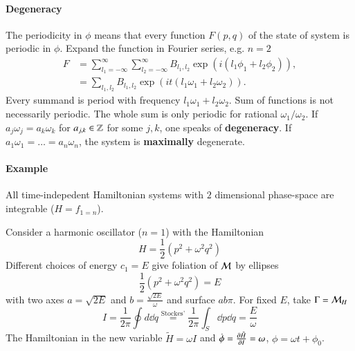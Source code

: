 \paragraph{Degeneracy}
The periodicity in $\phi$ means that every function $F(p, q)$ of the state of system is periodic in $\phi$. Expand the function in Fourier series, e.g. $n=2$
\begin{align*}
	F &= \sum_{l_1 = -\infty}^{\infty}\sum_{l_2 = -\infty}^{\infty} B_{l_1, l_2} \exp(i (l_1 \phi_1 + l_2\phi_2)), \\
	  &= \sum_{l_1, l_2} B_{l_1, l_2} \exp(it(l_1 \omega_1 + l_2 \omega_2)).
\end{align*}
Every summand is period with frequency $l_1\omega_1 + l_2\omega_2$. Sum of functions is not necessarily periodic. The whole sum is only periodic for rational $\omega_1 / \omega_2$. If $a_j \omega_j = a_k \omega_k$ for $a_{j, k} \in \mathbb{Z}$ for some $j, k$, one speaks of \textbf{degeneracy}. If $a_1\omega_1 = \dots = a_n \omega_n$, the system is \textbf{maximally} degenerate.

\paragraph{Example}
All time-indepedent Hamiltonian systems with $2$ dimensional phase-space are integrable ($H=f_{1=n}$). 

Consider a harmonic oscillator ($n=1$) with the Hamiltonian
\begin{equation*}
	H = \frac{1}{2} (p^2 + \omega^2 q^2)
\end{equation*}
Different choices of energy $c_1 = E$ give foliation of $\mathcal{M}$ by ellipses
\begin{equation*}
	\frac{1}{2} \left( p^2 + \omega^2 q^2 \right) 	 = E
\end{equation*}
with two axes $a = \sqrt{2E}$ and $b = \frac{\sqrt{2E}}{\omega}$ and surface $ab\pi$. For fixed $E$, take $\Gamma = \mathcal{M}_H$
\begin{equation*}
	I = \frac{1}{2\pi} \oint d\dd{q} \stackrel{\text{Stockes'}}{=} \frac{1}{2\pi} \int_{S} \dd{p} \dd{q} = \frac{E}{\omega}
\end{equation*}
The Hamiltonian in the new variable $\tilde{H} = \omega I$ and $\dot{\phi} = \pdv{\tilde{H}}{I} = \omega$, $\phi = \omega t + \phi_0$. 

